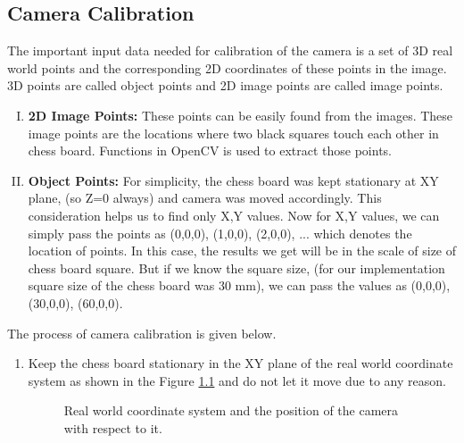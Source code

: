 \documentclass[a4paper,12pt]{report}
\begin{document}
\begin{appendices}
	\chapter{Camera Calibration} \label{Camera Calibration}
	
	The important input data needed for calibration of the camera is a set of 3D real world points and the corresponding 2D coordinates of these points in the image. 3D points are called object points and 2D image points are called image points.
	
	\begin{enumerate}[I.]
		\item \textbf{2D Image Points:} These points can be easily found from the images. These image points are the locations where two black squares touch each other in chess board. Functions in OpenCV is used to extract those points\cite{cam_calib:_nodate}.
		
		\item \textbf{Object Points:}  For simplicity, the chess board was kept stationary at XY plane, (so Z=0 always) and camera was moved accordingly. This consideration helps us to find only X,Y values. Now for X,Y values, we can simply pass the points as (0,0,0), (1,0,0), (2,0,0), ... which denotes the location of points. In this case, the results we get will be in the scale of size of chess board square\cite{cam_calib:_nodate}. But if we know the square size, (for our implementation square size of the chess board was 30 mm), we can pass the values as (0,0,0), (30,0,0), (60,0,0).
	\end{enumerate}
	
	The process of camera calibration is given below.
	
	\begin{enumerate}
		\item Keep the chess board stationary in the XY plane of the real world coordinate system as shown in the Figure \ref{fig:clib3dworld} and do not let it move due to any reason.
		
		\begin{figure}[h]
			\centering
			\caption{Real world coordinate system and the position of the camera with respect to it. }
			\label{fig:clib3dworld}
		\end{figure}
		

\end{enumerate}
\end{appendices}
\end{document}
